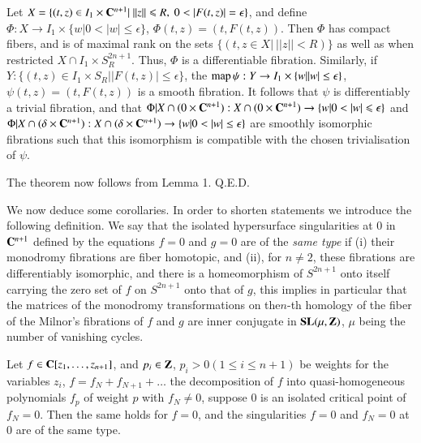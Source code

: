 Let $X = \{(t,z) \in I_1 \times \mathbf{C}^{n+1} | ~ || z|| \leqslant R, ~ 0 < | F (t,z)| = \epsilon\}$, and define $\Phi: X \to I_1 \times \{w |0 < | w |\leqslant \epsilon\}$, $\Phi (t,z) = (t, F (t,z))$. Then $\Phi$ has compact fibers, and is of maximal rank on the sets $\{(t,z \in X | ~||z|| < R)\}$ as well as when restricted $X \cap I_1 \times S^{2n+1}_R$. Thus, $\Phi$ is a differentiable fibration. Similarly, if $Y: \{(t,z) \in I_1 \times S_R ||F (t,z) | \leqslant \epsilon\}$, the $\operatorname{map} \psi: Y \to I_1 \times \{w ||w|\leq \epsilon\}$, $\psi (t,z) = (t, F(t,z))$ is a smooth fibration. It follows that $\psi$ is differentiably a trivial fibration, and that $\Phi | X \cap (0 \times \mathbf{C}^{n+1}): X \cap (0 \times \mathbf{C}^{n+1}) \to \{w |0 < |w| \leqslant \epsilon\}$ and $\Phi|X \cap (\delta \times \mathbf{C}^{n+1}): X \cap (\delta \times \mathbf{C}^{n+1}) \to \{w |0 < |w| \leq \epsilon\}$ are smoothly isomorphic fibrations such that this isomorphism is compatible with the chosen trivialisation of $\psi$.

The theorem now follows from Lemma 1. \hfill{Q.E.D.}

We now deduce some corollaries. In order to shorten statements we introduce the following definition. We say that the isolated hypersurface singularities at 0 in $\mathbf{C}^{n+1}$ defined by the equations $f=0$ and $g=0$ are of the {\em same type} if (i) their monodromy fibrations are fiber homotopic, and (ii), for $n \neq 2$, these fibrations are differentiably isomorphic, and there is a homeomorphism of $S^{2n+1}$ onto itself carrying the zero set of $f$ on $S^{2n+1}$ onto that of $g$, this implies in particular that the matrices of the monodromy transformations on the\pageoriginale $n$-th homology of the fiber of the Milnor's fibrations of $f$ and $g$ are inner conjugate in $\mathbf{S} \mathbf{L} (\mu, \mathbf{Z})$, $\mu$ being the number of vanishing cycles.

\begin{corollary}\label{art10-coro2.4}
Let $f \in \mathbf{C}[z_1,\ldots, z_{n+1}]$, and $p_i \in \mathbf{Z}$, $p_i > 0 (1\leqslant i \leqslant n +1)$ be weights for the variables $z_i$, $f = f_N + f_{N+1} + \ldots$ the decomposition of $f$ into quasi-homogeneous polynomials $f_p$ of weight $p$ with $f_N \neq 0$, suppose 0 is an isolated critical point of $f_N = 0$. Then the same holds for $f=0$, and the singularities $f=0$ and $f_N =0$ at $0$ are of the same type.
\end{corollary}

